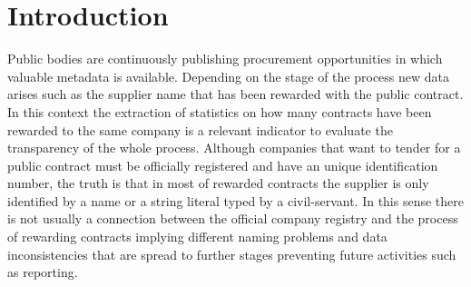 \documentclass[1p,12pt]{elsarticle}
\begin{document}
% 
% 
% 
% 
% 
% 
% 
% 
% 
% 
% 



\section{Introduction}
Public bodies are continuously publishing procurement opportunities in which 
valuable metadata is available. Depending on the stage of the process new data arises such 
as the supplier name that has been rewarded with the public contract. In this 
context the extraction of statistics on how many contracts have been 
rewarded to the same company is a relevant indicator to evaluate the transparency 
of the whole process. Although companies that want to tender for a public contract must be 
officially registered and have an unique identification number, the truth is 
that in most of rewarded contracts the supplier is only identified by a name or a string literal typed 
by a civil-servant. In this sense there is not usually a connection between 
the official company registry and the process of rewarding contracts implying different 
naming problems and data inconsistencies that are spread to further stages preventing future 
activities such as reporting.
\end{document}
